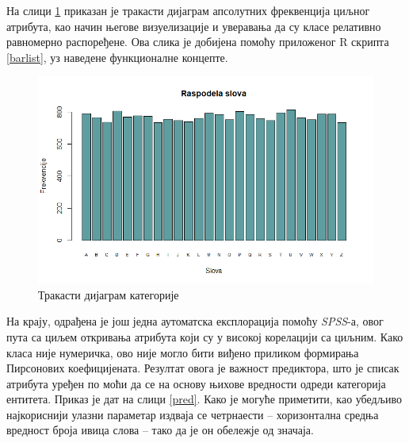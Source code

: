 \documentclass[a4paper]{article}
\begin{document}
На слици \ref{barplot} приказан је тракасти дијаграм апсолутних фреквенција циљног атрибута, као начин његове визуелизације и уверавања да су класе релативно равномерно распоређене. Ова слика је добијена помоћу приложеног R скрипта \ref{barlist}, уз наведене функционалне концепте.



\begin{figure}[h!]
\begin{center}
\includegraphics[scale=0.5]{../Slike za rad/Trakasti dijagram.png}
\end{center}
\caption{Тракасти дијаграм категорије}
\label{barplot}
\end{figure}

На крају, одрађена је још једна аутоматска експлорација помоћу \textit{SPSS}-а, овог пута са циљем откривања атрибута који су у високој корелацији са циљним. Како класа није нумеричка, ово није могло бити виђено приликом формирања Пирсонових коефицијената. Резултат овога је важност предиктора, што је списак атрибута уређен по моћи да се на основу њихове вредности одреди категорија ентитета. Приказ је дат на слици \ref{pred}. Како је могуће приметити, као убедљиво најкориснији улазни параметар издваја се четрнаести -- хоризонтална средња вредност броја ивица слова -- тако да је он обележје од значаја.
\end{document}
